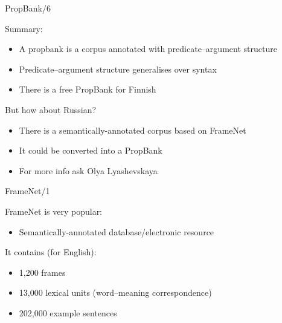 \documentclass[10pt, compress]{beamer}
\begin{document}
\begin{frame}{PropBank/6}

Summary:

\begin{itemize}
  \item A propbank is a corpus annotated with predicate--argument structure
  \item Predicate--argument structure generalises over syntax
  \item There is a free PropBank for Finnish
\end{itemize}

But how about Russian?

\begin{itemize}
  \item There is a semantically-annotated corpus based on FrameNet
  \item It could be converted into a PropBank 
  \item For more info ask Olya Lyashevskaya
\end{itemize}

\end{frame}

\begin{frame}{FrameNet/1}

FrameNet is very popular:

\begin{itemize}
  \item Semantically-annotated database/electronic resource
\end{itemize}

It contains (for English):
\begin{itemize}
  \item 1,200 frames
  \item 13,000 lexical units (word--meaning correspondence)
  \item 202,000 example sentences
\end{itemize}


\end{frame}
\end{document}
